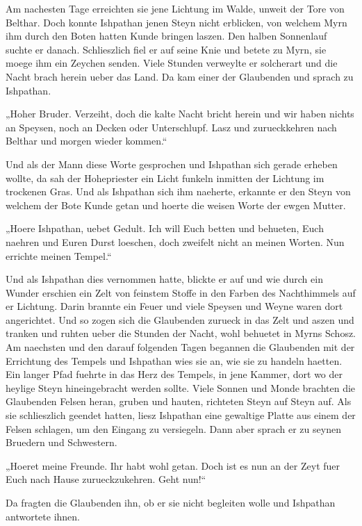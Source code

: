 \documentclass[a5paper,8pt]{book}
\begin{document}
Am nachesten Tage erreichten sie jene Lichtung im Walde, unweit der Tore von Belthar. Doch konnte Ishpathan jenen Steyn nicht erblicken, von welchem Myrn ihm durch den Boten hatten Kunde bringen laszen. Den halben Sonnenlauf suchte er danach. Schlieszlich fiel er auf seine Knie und betete zu Myrn, sie moege ihm ein Zeychen senden. Viele Stunden verweylte er solcherart und die Nacht brach herein ueber das Land. Da kam einer der Glaubenden und sprach zu Ishpathan.

„Hoher Bruder. Verzeiht, doch die kalte Nacht bricht herein und wir haben nichts an Speysen, noch an Decken oder Unterschlupf. Lasz und zurueckkehren nach Belthar und morgen wieder kommen.“

Und als der Mann diese Worte gesprochen und Ishpathan sich gerade erheben wollte, da sah der Hohepriester ein Licht funkeln inmitten der Lichtung im trockenen Gras. Und als Ishpathan sich ihm naeherte, erkannte er den Steyn von welchem der Bote Kunde getan und hoerte die weisen Worte der ewgen Mutter.

„Hoere Ishpathan, uebet Gedult. Ich will Euch betten und behueten, Euch naehren und Euren Durst loeschen, doch zweifelt nicht an meinen Worten. Nun errichte meinen Tempel.“

Und als Ishpathan dies vernommen hatte, blickte er auf und wie durch ein Wunder erschien ein Zelt von feinstem Stoffe in den Farben des Nachthimmels auf er Lichtung. Darin brannte ein Feuer und viele Speysen und Weyne waren dort angerichtet. Und so zogen sich die Glaubenden zurueck in das Zelt und aszen und tranken und ruhten ueber die Stunden der Nacht, wohl behuetet in Myrns Schosz.
Am naechsten und den darauf folgenden Tagen begannen die Glaubenden mit der Errichtung des Tempels und Ishpathan wies sie an, wie sie zu handeln haetten. Ein langer Pfad fuehrte in das Herz des Tempels, in jene Kammer, dort wo der heylige Steyn hineingebracht werden sollte. Viele Sonnen und Monde brachten die Glaubenden Felsen heran, gruben und hauten, richteten Steyn auf Steyn auf. Als sie schlieszlich geendet hatten, liesz Ishpathan eine gewaltige Platte aus einem der Felsen schlagen, um den Eingang zu versiegeln. Dann aber sprach er zu seynen Bruedern und Schwestern.

„Hoeret meine Freunde. Ihr habt wohl getan. Doch ist es nun an der Zeyt fuer Euch nach Hause zurueckzukehren. Geht nun!“

Da fragten die Glaubenden ihn, ob er sie nicht begleiten wolle und Ishpathan antwortete ihnen.
\end{document}
